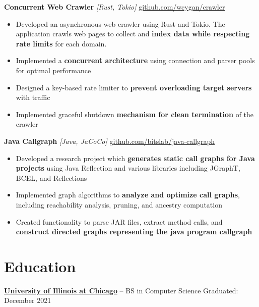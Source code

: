 \documentclass[10pt]{article}
\begin{document}
\textbf{Concurrent Web Crawler} \textit{[Rust, Tokio]} \hfill \href{https://github.com/wcygan/crawler}{github.com/wcygan/crawler}
\vspace{-4pt}
\begin{itemize}
  \item Developed an asynchronous web crawler using Rust and Tokio. The application crawls web pages to collect and \textbf{index data while respecting rate limits} for each domain.
  \item Implemented a \textbf{concurrent architecture} using connection and parser pools for optimal performance
  \item Designed a key-based rate limiter to \textbf{prevent overloading target servers} with traffic
  \item Implemented graceful shutdown \textbf{mechanism for clean termination} of the crawler
\end{itemize}

\textbf{Java Callgraph} \textit{[Java, JaCoCo]} \hfill \href{https://github.com/bitslab/java-callgraph}{github.com/bitslab/java-callgraph}
\vspace{-4pt}
\begin{itemize}
  \item Developed a research project which \textbf{generates static call graphs for Java projects} using Java Reflection and various libraries including JGraphT, BCEL, and Reflections
  \item Implemented graph algorithms to \textbf{analyze and optimize call graphs}, including reachability analysis, pruning, and ancestry computation
  \item Created functionality to parse JAR files, extract method calls, and \textbf{construct directed graphs representing the java program callgraph}
\end{itemize}

\vspace{5pt}

\section*{Education}
\vspace{4pt}
\textbf{\href{https://www.uic.edu/}{University of Illinois at Chicago}} -- BS in Computer Science \hfill Graduated: December 2021
\end{document}
